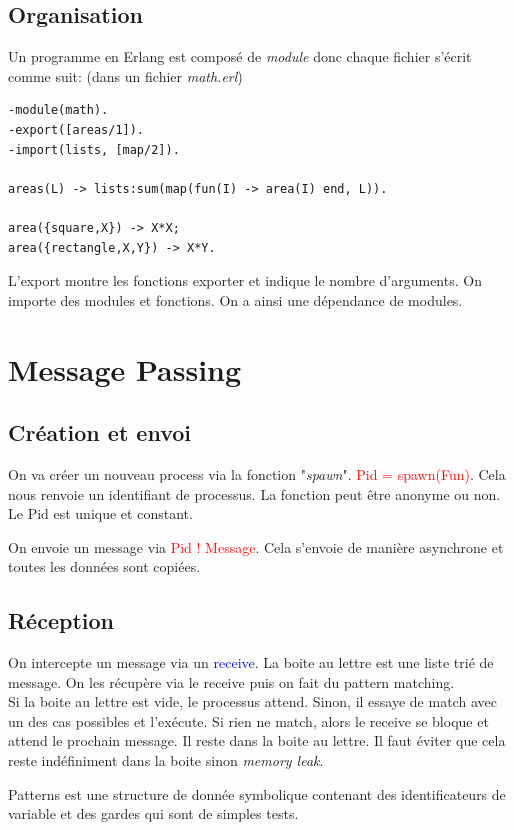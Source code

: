 \documentclass{report}
\begin{document}
\subsection{Organisation}
Un programme en Erlang est composé de \textit{module}	 donc chaque fichier s'écrit comme suit: (dans un fichier \textit{math.erl})
\begin{lstlisting}[escapechar=\%]
-module(math).
-export([areas/1]).
-import(lists, [map/2]). 

areas(L) -> lists:sum(map(fun(I) -> area(I) end, L)).

area({square,X}) -> X*X;
area({rectangle,X,Y}) -> X*Y.
\end{lstlisting}
L'export montre les fonctions exporter et indique le nombre d'arguments. On importe des modules et fonctions. On a ainsi une dépendance de modules.

\section{Message Passing}
\subsection{Création et envoi}
On va créer un nouveau process via la fonction "\textit{spawn}". \textcolor{red}{Pid = spawn(Fun)}. Cela nous renvoie un identifiant de processus. La fonction peut être anonyme ou non. Le Pid est unique et constant. \par 
On envoie un message via \textcolor{red}{Pid ! Message}. Cela s'envoie de manière asynchrone et toutes les données sont copiées.

\subsection{Réception}
 On intercepte un message via un \textcolor{blue}{receive}. La boite au lettre est une liste trié de message. On les récupère via le receive puis on fait du pattern matching.\\
Si la boite au lettre est vide, le processus attend. Sinon, il essaye de match avec un des cas possibles et l'exécute. Si rien ne match, alors le receive se bloque et attend le prochain message. Il reste dans la boite au lettre. Il faut éviter que cela reste indéfiniment dans la boite sinon \textit{memory leak}. \par
Patterns est une structure de donnée symbolique contenant des identificateurs de variable et des gardes qui sont de simples tests.
\end{document}
